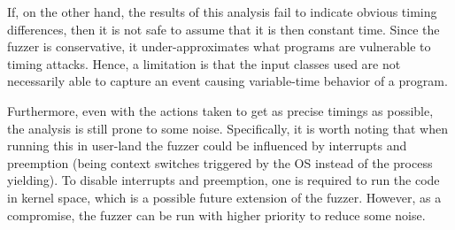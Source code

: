If, on the other hand, the results of this analysis fail to indicate obvious timing differences, then it is not safe to assume that it is then constant time. 
Since the fuzzer is conservative, it under-approximates what programs are vulnerable to timing attacks.
Hence, a limitation is that the input classes used are not necessarily able to capture an event causing variable-time behavior of a program. 

Furthermore, even with the actions taken to get as precise timings as possible, the analysis is still prone to some noise. 
Specifically, it is worth noting that when running this in user-land the fuzzer could be influenced by interrupts and preemption (being context switches triggered by the OS instead of the process yielding). 
To disable interrupts and preemption, one is required to run the code in kernel space, which is a possible future extension of the fuzzer. 
However, as a compromise, the fuzzer can be run with higher priority to reduce some noise. 
